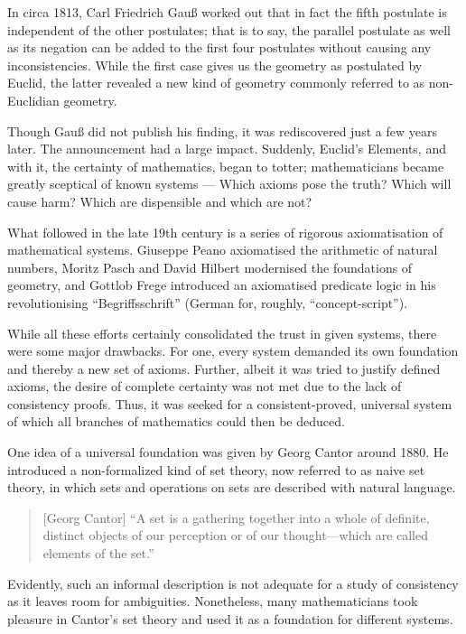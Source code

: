 \documentclass[hidelinks]{article}
\theoremstyle{plain}
\theoremstyle{definition}
\theoremstyle{rem}
\begin{document}
In circa 1813, Carl Friedrich Gauß worked out that in fact the fifth postulate is independent of the other postulates; that is to say, the parallel postulate as well as its negation can be added to the first four postulates without causing any inconsistencies. While the first case gives us the geometry as postulated by Euclid, the latter revealed a new kind of geometry commonly referred to as non-Euclidian geometry.

Though Gauß did not publish his finding, it was rediscovered just a few years later. The announcement had a large impact. Suddenly, Euclid's Elements, and with it, the certainty of mathematics, began to totter; mathematicians became greatly sceptical of known systems --- Which axioms pose the truth? Which will cause harm? Which are dispensible and which are not?

What followed in the late 19th century is a series of rigorous axiomatisation of mathematical systems. Giuseppe Peano axiomatised the arithmetic of natural numbers, Moritz Pasch and David Hilbert modernised the foundations of geometry, and Gottlob Frege introduced an axiomatised predicate logic in his revolutionising ``Begriffsschrift'' (German for, roughly, ``concept-script'').

While all these efforts certainly consolidated the trust in given systems, there were some major drawbacks. For one, every system demanded its own foundation and thereby a new set of axioms. Further, albeit it was tried to justify defined axioms, the desire of complete certainty was not met due to the lack of consistency proofs. Thus, it was seeked for a consistent-proved, universal system of which all branches of mathematics could then be deduced.

One idea of a universal foundation was given by Georg Cantor around 1880. He introduced a non-formalized kind of set theory, now referred to as naive set theory, in which sets and operations on sets are described with natural language. 

\begin{quote}[Georg Cantor]
``A set is a gathering together into a whole of definite, distinct objects of our perception or of our thought—which are called elements of the set.''\cite{cantor_set}
\end{quote}

Evidently, such an informal description is not adequate for a study of consistency as it leaves room for ambiguities. Nonetheless, many mathematicians took pleasure in Cantor's set theory and used it as a foundation for different systems.
\end{document}
